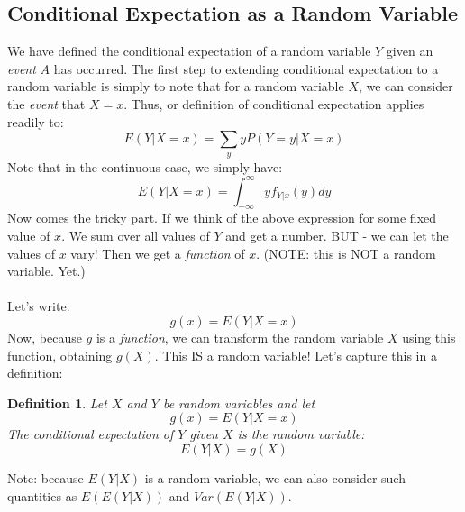 \documentclass[12pt]{article} %
\newcommand{\infi}{\int_{-\infty}^\infty}
\newtheorem{defn}{Definition}
\begin{document}
\subsection{Conditional Expectation as a Random Variable}
We have defined the conditional expectation of a random variable $Y$ given an \emph{event} $A$ has occurred. The first step to extending conditional expectation to a random variable is simply to note that for a random variable $X$, we can consider the \emph{event} that $X=x$.  Thus, or definition of conditional expectation applies readily to:
$$E(Y|X=x) = \sum_y y P(Y=y|X=x)$$
Note that in the continuous case, we simply  have:
$$E(Y|X=x) = \infi y f_{Y|x}(y) dy$$
Now comes the tricky part. If we think of the above expression for some fixed value of $x$. We sum over all values of $Y$ and get a number. BUT - we can let the values of $x$ vary! Then we get a \emph{function} of $x$. (NOTE: this is NOT a random variable. Yet.)\\\\
Let's write:
$$g(x) = E(Y|X=x)$$
Now, because $g$ is a \emph{function}, we can transform the random variable $X$ using this function, obtaining $g(X)$. This IS a random variable! Let's capture this in a definition:
\begin{defn}
Let $X$ and $Y$ be random variables and let
$$g(x) = E(Y|X=x)$$
The conditional expectation of $Y$ given $X$ is the random variable:
$$E(Y|X) = g(X)$$
\end{defn}
Note: because $E(Y|X)$ is a random variable, we can also consider such quantities as $E(E(Y|X))$ and $Var(E(Y|X))$.\\\\
\end{document}
